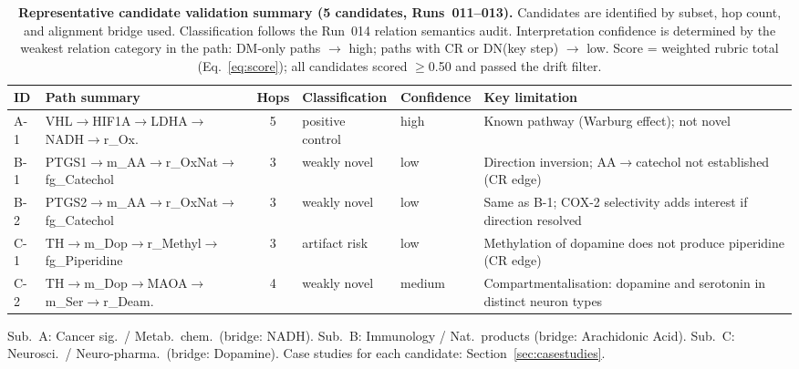 \begin{table}[h]
\caption{%
  \textbf{Representative candidate validation summary (5 candidates, Runs~011--013).}
  Candidates are identified by subset, hop count, and alignment bridge used.
  Classification follows the Run~014 relation semantics audit.
  Interpretation confidence is determined by the weakest relation category
  in the path: DM-only paths $\to$ high; paths with CR or DN(key step) $\to$ low.
  Score = weighted rubric total (Eq.~\ref{eq:score}); all candidates scored
  $\geq$0.50 and passed the drift filter.
}
\label{tab:candidate_summary}
\small
\begin{tabularx}{\linewidth}{llcllX}
\toprule
ID & Path summary & Hops & Classification & Confidence & Key limitation \\
\midrule
A-1 & VHL$\to$HIF1A$\to$LDHA$\to$NADH$\to$r\_Ox. &
  5 & positive control & high &
  Known pathway (Warburg effect); not novel \\
\addlinespace
B-1 & PTGS1$\to$m\_AA$\to$r\_OxNat$\to$fg\_Catechol &
  3 & weakly novel & low &
  Direction inversion; AA$\to$catechol not established (CR edge) \\
\addlinespace
B-2 & PTGS2$\to$m\_AA$\to$r\_OxNat$\to$fg\_Catechol &
  3 & weakly novel & low &
  Same as B-1; COX-2 selectivity adds interest if direction resolved \\
\addlinespace
C-1 & TH$\to$m\_Dop$\to$r\_Methyl$\to$fg\_Piperidine &
  3 & artifact risk & low &
  Methylation of dopamine does not produce piperidine (CR edge) \\
\addlinespace
C-2 & TH$\to$m\_Dop$\to$MAOA$\to$m\_Ser$\to$r\_Deam. &
  4 & weakly novel & medium &
  Compartmentalisation: dopamine and serotonin in distinct neuron types \\
\bottomrule
\end{tabularx}

\smallskip
\noindent Sub.\ A: Cancer sig.\ / Metab.\ chem.\ (bridge: NADH).
Sub.\ B: Immunology / Nat.\ products (bridge: Arachidonic Acid).
Sub.\ C: Neurosci.\ / Neuro-pharma.\ (bridge: Dopamine).
Case studies for each candidate: Section~\ref{sec:casestudies}.
\end{table}
